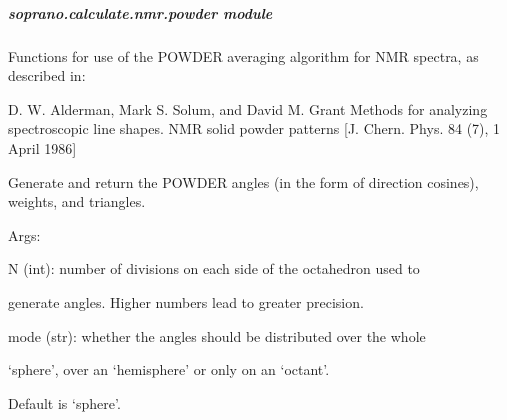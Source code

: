 \documentclass[letterpaper,10pt,english]{sphinxmanual}
\begin{document}
\subparagraph{soprano.calculate.nmr.powder module}
\label{doctree/soprano.calculate.nmr.powder:soprano-calculate-nmr-powder-module}\label{doctree/soprano.calculate.nmr.powder::doc}\label{doctree/soprano.calculate.nmr.powder:module-soprano.calculate.nmr.powder}
Functions for use of the POWDER averaging algorithm for NMR spectra,
as described in:

D. W. Alderman, Mark S. Solum, and David M. Grant
Methods for analyzing spectroscopic line shapes. NMR solid powder patterns
{[}J. Chern. Phys. 84 (7), 1 April 1986{]}

\begin{fulllineitems}
\label{doctree/soprano.calculate.nmr.powder:soprano.calculate.nmr.powder.gen_pwd_ang}
Generate and return the POWDER angles (in the form of direction cosines),
weights, and triangles.

\begin{DUlineblock}{0em}
\item[] Args:
\item[]
\begin{DUlineblock}{\DUlineblockindent}
\item[] N (int): number of divisions on each side of the octahedron used to
\item[]
\begin{DUlineblock}{\DUlineblockindent}
\item[] generate angles. Higher numbers lead to greater precision.
\end{DUlineblock}
\item[] mode (str): whether the angles should be distributed over the whole
\item[]
\begin{DUlineblock}{\DUlineblockindent}
\item[] `sphere', over an `hemisphere' or only on an `octant'.
\item[] Default is `sphere'.
\end{DUlineblock}
\end{DUlineblock}
\end{DUlineblock}


\end{fulllineitems}
\end{document}
